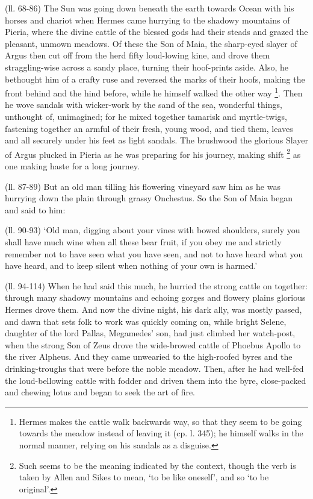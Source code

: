 (ll. 68-86) The Sun was going down beneath the earth towards Ocean with his
horses and chariot when Hermes came hurrying to the shadowy mountains of
Pieria, where the divine cattle of the blessed gods had their steads and grazed
the pleasant, unmown meadows. Of these the Son of Maia, the sharp-eyed slayer
of Argus then cut off from the herd fifty loud-lowing kine, and drove them
straggling-wise across a sandy place, turning their hoof-prints aside. Also, he
bethought him of a crafty ruse and reversed the marks of their hoofs, making
the front behind and the hind before, while he himself walked the other way \footnote{Hermes makes the cattle
walk backwards way, so that they seem to be going towards the meadow instead of
leaving it (cp. l. 345); he himself walks in the normal manner, relying on his
sandals as a disguise.}. Then he wove sandals with
wicker-work by the sand of the sea, wonderful things, unthought of, unimagined;
for he mixed together tamarisk and myrtle-twigs, fastening together an armful
of their fresh, young wood, and tied them, leaves and all securely under his
feet as light sandals. The brushwood the glorious Slayer of Argus plucked in
Pieria as he was preparing for his journey, making shift \footnote{Such seems to be the
meaning indicated by the context, though the verb is taken by Allen and Sikes
to mean, ‘to be like oneself’, and so ‘to be
original’.} as one making haste for a long
journey.

(ll. 87-89) But an old man tilling his flowering vineyard saw him as he was
hurrying down the plain through grassy Onchestus. So the Son of Maia began and
said to him:

(ll. 90-93) ‘Old man, digging about your vines with bowed shoulders,
surely you shall have much wine when all these bear fruit, if you obey me and
strictly remember not to have seen what you have seen, and not to have heard
what you have heard, and to keep silent when nothing of your own is
harmed.’

(ll. 94-114) When he had said this much, he hurried the strong cattle on
together: through many shadowy mountains and echoing gorges and flowery plains
glorious Hermes drove them. And now the divine night, his dark ally, was mostly
passed, and dawn that sets folk to work was quickly coming on, while bright
Selene, daughter of the lord Pallas, Megamedes’ son, had just climbed her
watch-post, when the strong Son of Zeus drove the wide-browed cattle of Phoebus
Apollo to the river Alpheus. And they came unwearied to the high-roofed byres
and the drinking-troughs that were before the noble meadow. Then, after he had
well-fed the loud-bellowing cattle with fodder and driven them into the byre,
close-packed and chewing lotus and began to seek the art of fire.

